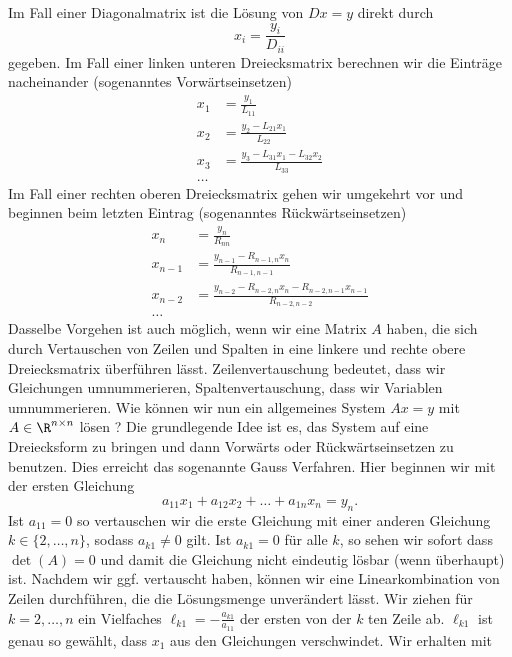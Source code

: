 Im Fall einer Diagonalmatrix ist die Lösung von \(Dx = y\) direkt durch
\begin{equation*}
 x_i = \frac{y_i}{D_{ii}}
\end{equation*}
gegeben. Im Fall einer linken unteren Dreiecksmatrix berechnen wir die Einträge nacheinander (sogenanntes Vorwärtseinsetzen)
\begin{align*}
x_1 &= \frac{y_1}{L_{11}} \\
x_2 &= \frac{y_2-L_{21} x_1}{L_{22}} \\
x_3 &= \frac{y_3-L_{31} x_1-L_{32} x_2}{L_{33}} \\
\ldots
\end{align*}
Im Fall einer rechten oberen Dreiecksmatrix gehen wir umgekehrt vor und beginnen beim letzten Eintrag (sogenanntes Rückwärtseinsetzen)
\begin{align*}
x_n &= \frac{y_n}{R_{nn}} \\
x_{n-1} &= \frac{y_{n-1}-R_{n-1,n} x_n}{R_{n-1,n-1}} \\
x_{n-2} &= \frac{y_{n-2}-R_{n-2,n} x_n-R_{n-2,n-1} x_{n-1}}{R_{n-2,n-2}} \\
\ldots
\end{align*}
Dasselbe Vorgehen ist auch möglich, wenn wir eine Matrix \(A\) haben, die sich durch Vertauschen von Zeilen und Spalten in eine linkere und rechte obere Dreiecksmatrix überführen lässt. Zeilenvertauschung bedeutet, dass wir Gleichungen umnummerieren, Spaltenvertauschung, dass wir Variablen umnummerieren.
Wie können wir nun ein allgemeines System \(Ax = y\) mit \(A \in \R^{n \times n}\) lösen ? Die grundlegende Idee ist es, das System auf eine Dreiecksform zu bringen und dann Vorwärts  oder Rückwärtseinsetzen zu benutzen. Dies erreicht das sogenannte Gauss Verfahren. Hier beginnen wir mit der ersten Gleichung
\begin{equation*}
 a_{11}x_1 + a_{12} x_2 + \ldots + a_{1n} x_n = y_n.
\end{equation*}
Ist \(a_{11}=0\) so vertauschen wir die erste Gleichung mit einer anderen Gleichung \(k \in \{2,\ldots,n\}\), sodass \(a_{k1} \neq 0\) gilt. Ist \(a_{k1}=0\) für alle \(k\), so sehen wir sofort dass \(\det(A)=0\) und damit die Gleichung nicht eindeutig lösbar (wenn überhaupt) ist.  Nachdem wir ggf. vertauscht haben, können wir eine Linearkombination von Zeilen durchführen, die die Lösungsmenge unverändert lässt. Wir ziehen für \(k=2,\ldots,n\) ein Vielfaches \(\ell_{k1} = - \frac{a_{k1}}{a_{11}}\) der ersten von der \(k\) ten Zeile ab. \(\ell_{k1}\) ist genau so gewählt, dass \(x_1\) aus den Gleichungen verschwindet. Wir erhalten mit
